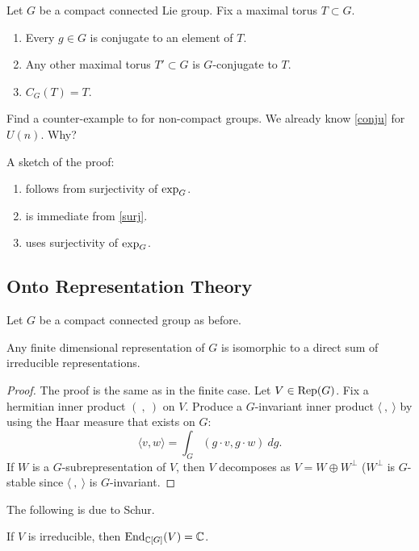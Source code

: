 \begin{thm}
Let $G$ be a compact connected Lie group. Fix a maximal torus $T \subset G$.
\begin{enumerate}[(1)]
\item\label{conju} Every $g \in G$ is conjugate to an element of $T$.
\item Any other maximal torus $T' \subset G$ is $G$-conjugate to $T$.
\item $C_G(T) = T$.
\end{enumerate}
\end{thm}

\begin{ex}
Find a counter-example to for non-compact groups. We already know \ref{conju}
for $U(n)$. Why?
\end{ex}

A sketch of the proof:

\begin{enumerate}[(1)]
\item\label{surj} follows from surjectivity of $\operatorname{exp}_G$.
\item is immediate from \ref{surj}.
\item uses surjectivity of $\operatorname{exp}_G$.
\end{enumerate}

\subsection{Onto Representation Theory}
Let $G$ be a compact connected group as before.

\begin{prop}
Any finite dimensional representation of $G$ is isomorphic to a direct sum of
irreducible representations.
\end{prop}

\begin{proof}
The proof is the same as in the finite case. Let $V \in \mathrm{Rep}(G)$. Fix a 
hermitian inner product $( \ , \ )$ on $V$. Produce a $G$-invariant inner product $\langle \ , \ \rangle$ by using the Haar measure that exists on $G$:
\[ \langle v, w \rangle = \int_G (g \cdot v, g \cdot w) \ dg. \]
If $W$ is a $G$-subrepresentation of $V$, then $V$ decomposes as
$V = W \oplus W^\perp$ ($W^\perp$ is $G$-stable since $\langle \ , \ \rangle$ is
$G$-invariant.
\end{proof}

The following is due to Schur.

\begin{cor}
If $V$ is irreducible, then $\operatorname{End}_{\mathbb{C}[G]}(V) = \mathbb{C}$.
\end{cor}


